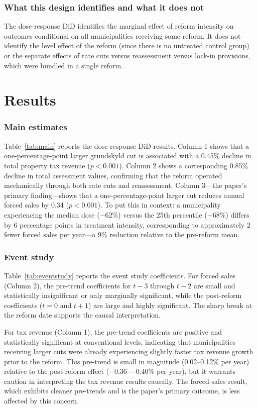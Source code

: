 \documentclass[12pt]{article}
\begin{document}
\subsubsection*{What this design identifies and what it does not} The dose-response DiD identifies the marginal effect of reform intensity on outcomes conditional on all municipalities receiving some reform. It does not identify the level effect of the reform (since there is no untreated control group) or the separate effects of rate cuts versus reassessment versus lock-in provisions, which were bundled in a single reform.

\section{Results}

\subsubsection*{Main estimates} Table~\ref{tab:main} reports the dose-response DiD results. Column 1 shows that a one-percentage-point larger grundskyld cut is associated with a 0.45\% decline in total property tax revenue ($p < 0.001$). Column 2 shows a corresponding 0.85\% decline in total assessment values, confirming that the reform operated mechanically through both rate cuts and reassessment. Column 3---the paper's primary finding---shows that a one-percentage-point larger cut reduces annual forced sales by 0.34 ($p < 0.001$). To put this in context: a municipality experiencing the median dose ($-62\%$) versus the 25th percentile ($-68\%$) differs by 6 percentage points in treatment intensity, corresponding to approximately 2 fewer forced sales per year---a 9\% reduction relative to the pre-reform mean.



\subsubsection*{Event study} Table~\ref{tab:eventstudy} reports the event study coefficients. For forced sales (Column 2), the pre-trend coefficients for $t - 3$ through $t - 2$ are small and statistically insignificant or only marginally significant, while the post-reform coefficients ($t = 0$ and $t + 1$) are large and highly significant. The sharp break at the reform date supports the causal interpretation.

For tax revenue (Column 1), the pre-trend coefficients are positive and statistically significant at conventional levels, indicating that municipalities receiving larger cuts were already experiencing slightly faster tax revenue growth prior to the reform. This pre-trend is small in magnitude (0.02--0.12\% per year) relative to the post-reform effect ($-0.36$--$-0.40\%$ per year), but it warrants caution in interpreting the tax revenue results causally. The forced-sales result, which exhibits cleaner pre-trends and is the paper's primary outcome, is less affected by this concern.
\end{document}
